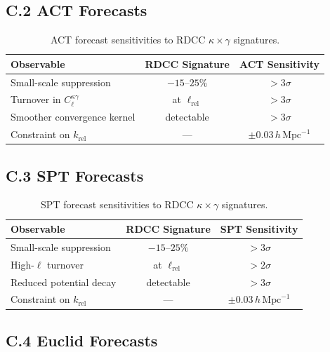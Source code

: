 \documentclass[11pt,a4paper]{article}
\begin{document}
\subsection*{C.2 ACT Forecasts}

\begin{table}[H]
\centering
\begin{tabular}{lcc}
\hline
\textbf{Observable} & \textbf{RDCC Signature} & \textbf{ACT Sensitivity} \\
\hline
Small-scale suppression & $-15$--$25\%$ & $>3\sigma$ \\
Turnover in $C_{\ell}^{\kappa\gamma}$ & at $\ell_{\mathrm{rel}}$ & $>3\sigma$ \\
Smoother convergence kernel & detectable & $>3\sigma$ \\
Constraint on $k_{\mathrm{rel}}$ & --- & $\pm 0.03\,h\,\mathrm{Mpc}^{-1}$ \\
\hline
\end{tabular}
\caption{ACT forecast sensitivities to RDCC $\kappa \times \gamma$ signatures.}
\end{table}

\subsection*{C.3 SPT Forecasts}

\begin{table}[H]
\centering
\begin{tabular}{lcc}
\hline
\textbf{Observable} & \textbf{RDCC Signature} & \textbf{SPT Sensitivity} \\
\hline
Small-scale suppression & $-15$--$25\%$ & $>3\sigma$ \\
High-$\ell$ turnover & at $\ell_{\mathrm{rel}}$ & $>2\sigma$ \\
Reduced potential decay & detectable & $>3\sigma$ \\
Constraint on $k_{\mathrm{rel}}$ & --- & $\pm 0.03\,h\,\mathrm{Mpc}^{-1}$ \\
\hline
\end{tabular}
\caption{SPT forecast sensitivities to RDCC $\kappa \times \gamma$ signatures.}
\end{table}

\subsection*{C.4 Euclid Forecasts}
\end{document}
